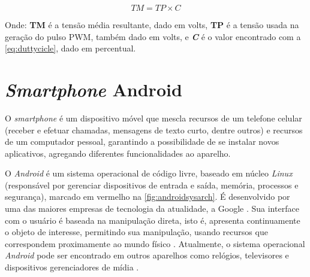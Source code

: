 \begin{equation}
{TM} = {TP} \times {C}
\label{eq:avervoltage}
\end{equation}

Onde: \textbf{TM} é a tensão média resultante, dado em volts, \textbf{TP} é a tensão usada na geração do pulso PWM, também dado em volts, e \textbf{\textit{C}} é o valor encontrado com a \autoref{eq:duttycicle}, dado em percentual.

\section{\textit{Smartphone} Android}
\label{sec:android}

O \textit{smartphone} é um dispositivo móvel que mescla recursos de um telefone celular (receber e efetuar chamadas, mensagens de texto curto, dentre outros) e recursos de um computador pessoal, garantindo a possibilidade de se instalar novos aplicativos, agregando diferentes funcionalidades ao aparelho.\par

O \textit{Android} é um sistema operacional de código livre, baseado em núcleo \textit{Linux} (responsável por gerenciar dispositivos de entrada e saída, memória, processos e segurança), marcado em vermelho na \autoref{fig:androidsysarch}. É desenvolvido por uma das maiores empresas de tecnologia da atualidade, a Google . Sua interface com o usuário é baseada na manipulação direta, isto é, apresenta continuamente o objeto de interesse, permitindo sua manipulação, usando recursos que correspondem proximamente ao mundo físico . Atualmente, o sistema operacional \textit{Android} pode ser encontrado em outros aparelhos como relógios, televisores e dispositivos gerenciadores de mídia . \par

